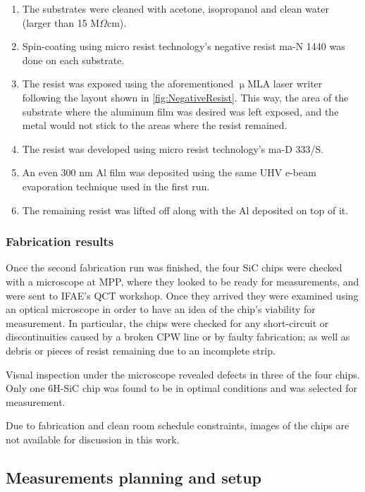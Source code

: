\documentclass[12pt, a4paper]{article}
\begin{document}
\begin{enumerate}
    \item The substrates were cleaned with acetone, isopropanol and clean water (larger than 15 M$\Omega$cm).
    \item Spin-coating using micro resist technology's negative resist ma-N 1440 was done on each substrate.
    \item The resist was exposed using the aforementioned $\upmu$MLA laser writer following the layout shown in \cref{fig:NegativeResist}. This way, the area of the substrate where the aluminum film was desired was left exposed, and the metal would not stick to the areas where the resist remained.
    \item The resist was developed using micro resist technology's ma-D 333/S.
    \item An even 300 nm Al film was deposited using the same UHV e-beam evaporation technique used in the first run.
    \item The remaining resist was lifted off along with the Al deposited on top of it.
\end{enumerate}

\subsubsection{Fabrication results}

Once the second fabrication run was finished, the four SiC chips were checked with a microscope at MPP, where they looked to be ready for measurements, and were sent to IFAE's QCT workshop. Once they arrived they were examined using an optical microscope in order to have an idea of the chip's viability for measurement. In particular, the chips were checked for any short-circuit or discontinuities caused by a broken CPW line or by faulty fabrication; as well as debris or pieces of resist remaining due to an incomplete strip.

Visual inspection under the microscope revealed defects in three of the four chips. Only one 6H-SiC chip was found to be in optimal conditions and was selected for measurement.

Due to fabrication and clean room schedule constraints, images of the chips are not available for discussion in this work.

\subsection{Measurements planning and setup}
\end{document}
